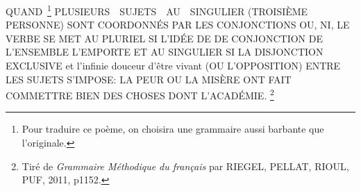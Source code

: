 


    	





  QUAND \footnote{Pour traduire ce poème, on choisira une grammaire aussi barbante que l’originale.}
  PLUSIEURS~ SUJETS~ AU~ SINGULIER (TROISIÈME PERSONNE) SONT COORDONNÉS PAR LES
  CONJONCTIONS OU, NI, LE VERBE SE MET AU PLURIEL SI L’IDÉE DE DE CONJONCTION DE
  L’ENSEMBLE L’EMPORTE ET AU SINGULIER SI LA DISJONCTION EXCLUSIVE
  et l’infinie douceur d’être vivant
  (OU L’OPPOSITION) ENTRE LES SUJETS S’IMPOSE: LA PEUR OU LA MISÈRE ONT FAIT
  COMMETTRE BIEN DES CHOSES DONT L’ACADÉMIE.
  \footnote{Tiré de \emph{Grammaire Méthodique du français} par \textsc{RIEGEL}, \textsc{PELLAT}, \textsc{RIOUL}, PUF, 2011, p1152.}

